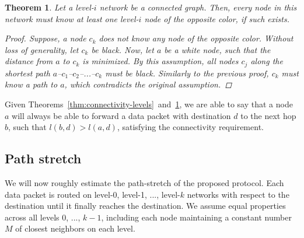 \documentclass[conference]{IEEEtran}
\newtheorem{thm}{Theorem}
\theoremstyle{definition}
\begin{document}
\begin{thm}
    Let a level-$i$ network be a connected graph. Then, every node in this network must know at least one level-$i$ node of the opposite color, if such exists.

    \begin{proof}
        Suppose, a node $c_k$ does not know any node of the opposite color. Without loss of generality, let $c_k$ be black. Now, let $a$ be a white node, such that the distance from $a$ to $c_k$ is minimized. By this assumption, all nodes $c_j$ along the shortest path $a$--$c_1$--$c_2$--...--$c_k$ must be black. Similarly to the previous proof, $c_k$ must know a path to $a$, which contradicts the original assumption.
    \end{proof}

    \label{thm:connectivity-colors}
\end{thm}

Given Theorems~\ref{thm:connectivity-levels}~and~\ref{thm:connectivity-colors}, we are able to say that a node $a$ will always be able to forward a data packet with destination $d$ to the next hop $b$, such that $l(b,d) > l(a,d)$, satisfying the connectivity requirement.


\subsection{Path stretch}
\label{sec:analysis:stretch}

We will now roughly estimate the path-stretch of the proposed protocol. Each data packet is routed on level-0, level-1, ..., level-$k$ networks with respect to the destination until it finally reaches the destination. We assume equal properties across all levels 0, ..., $k - 1$, including each node maintaining a constant number $M$ of closest neighbors on each level.
\end{document}
